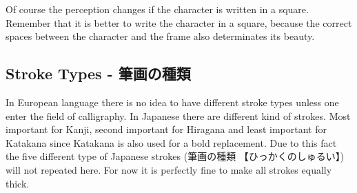\bigskip

Of course the perception changes if the character is written in a square.
Remember that it is better to write the character in a square, because the
correct spaces between the character and the frame also determinates its
beauty.

\bigskip


\bigskip

\subsection{Stroke Types - 筆画の種類}

In European language there is no idea to have different stroke types unless one
enter the field of calligraphy. In Japanese there are different kind of
strokes.  Most important for Kanji, second important for Hiragana and least
important for Katakana since Katakana is also used for a bold replacement.  Due
to this fact the five different type of Japanese strokes ({筆画の種類}
{【ひっかくのしゅるい】}) will not repeated here. For now it is perfectly fine
to make all strokes equally thick. 


